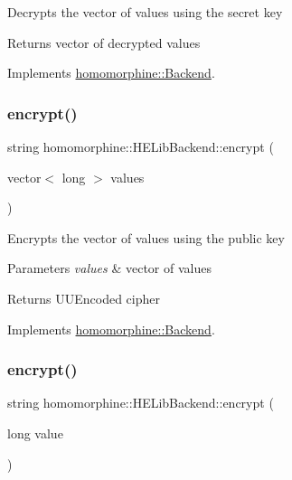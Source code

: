 Decrypts the vector of values using the secret key

\begin{DoxyReturn}{Returns}
vector of decrypted values 
\end{DoxyReturn}


Implements \mbox{\hyperlink{classhomomorphine_1_1_backend_a43638a85d3e1a85957f18be262c26f58}{homomorphine\+::\+Backend}}.

\mbox{\label{classhomomorphine_1_1_h_e_lib_backend_af030a10bdd905f7cccf72c8eabfefdd7}} 
\subsubsection{\texorpdfstring{encrypt()}{encrypt()}\hspace{0.1cm}{\footnotesize\ttfamily [1/2]}}
{\footnotesize\ttfamily string homomorphine\+::\+H\+E\+Lib\+Backend\+::encrypt (\begin{DoxyParamCaption}\item[{vector$<$ long $>$}]{values }\end{DoxyParamCaption})\hspace{0.3cm}{\ttfamily [virtual]}}

Encrypts the vector of values using the public key


\begin{DoxyParams}{Parameters}
{\em values} & vector of values \\
\hline
\end{DoxyParams}
\begin{DoxyReturn}{Returns}
U\+U\+Encoded cipher 
\end{DoxyReturn}


Implements \mbox{\hyperlink{classhomomorphine_1_1_backend_ade5ea47921fae4c5117e11ed1097b7ce}{homomorphine\+::\+Backend}}.

\mbox{\label{classhomomorphine_1_1_h_e_lib_backend_a6a958824a123eab41b2099dbc001dc13}} 
\subsubsection{\texorpdfstring{encrypt()}{encrypt()}\hspace{0.1cm}{\footnotesize\ttfamily [2/2]}}
{\footnotesize\ttfamily string homomorphine\+::\+H\+E\+Lib\+Backend\+::encrypt (\begin{DoxyParamCaption}\item[{long}]{value }\end{DoxyParamCaption})\hspace{0.3cm}{\ttfamily [virtual]}}

